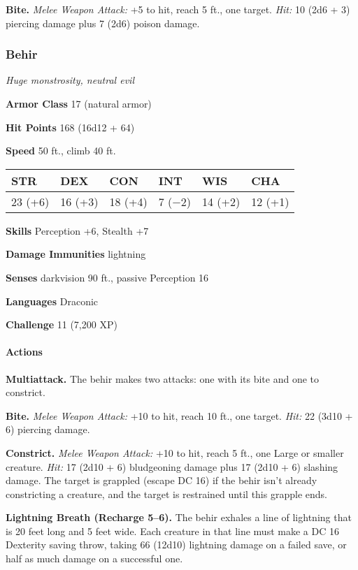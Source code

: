 \documentclass[
]{article}
\begin{document}
\textbf{Bite.} \emph{Melee Weapon Attack:} +5 to hit, reach 5 ft., one
target. \emph{Hit:} 10 (2d6 + 3) piercing damage plus 7 (2d6) poison
damage.

\hypertarget{behir}{%
\subsubsection{Behir}\label{behir}}

\emph{Huge monstrosity, neutral evil}

\textbf{Armor Class} 17 (natural armor)

\textbf{Hit Points} 168 (16d12 + 64)

\textbf{Speed} 50 ft., climb 40 ft.

\begin{longtable}[]{@{}llllll@{}}
\toprule
STR & DEX & CON & INT & WIS & CHA\tabularnewline
\midrule
\endhead
23 (+6) & 16 (+3) & 18 (+4) & 7 (−2) & 14 (+2) & 12 (+1)\tabularnewline
\bottomrule
\end{longtable}

\textbf{Skills} Perception +6, Stealth +7

\textbf{Damage Immunities} lightning

\textbf{Senses} darkvision 90 ft., passive Perception 16

\textbf{Languages} Draconic

\textbf{Challenge} 11 (7,200 XP)

\hypertarget{actions-1}{%
\paragraph{Actions}\label{actions-1}}

\textbf{Multiattack.} The behir makes two attacks: one with its bite and
one to constrict.

\textbf{Bite.} \emph{Melee Weapon Attack:} +10 to hit, reach 10 ft., one
target. \emph{Hit:} 22 (3d10 + 6) piercing damage.

\textbf{Constrict.} \emph{Melee Weapon Attack:} +10 to hit, reach 5 ft.,
one Large or smaller creature. \emph{Hit:} 17 (2d10 + 6) bludgeoning
damage plus 17 (2d10 + 6) slashing damage. The target is grappled
(escape DC 16) if the behir isn't already constricting a creature, and
the target is restrained until this grapple ends.

\textbf{Lightning Breath (Recharge 5--6).} The behir exhales a line of
lightning that is 20 feet long and 5 feet wide. Each creature in that
line must make a DC 16 Dexterity saving throw, taking 66 (12d10)
lightning damage on a failed save, or half as much damage on a
successful one.
\end{document}
